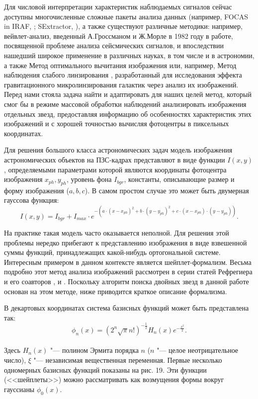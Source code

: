 Для числовой интерпретации характеристик наблюдаемых сигналов сейчас  доступны многочисленные сложные пакеты анализа данных (например,  FOCAS in IRAF, \cite{1981AJ.....86..476J}; SExtractor, \cite{1996A&AS..117..393B}), а также существуют различные методики: например, вейвлет-анализ, введенный А.Гроссманом и Ж.Морле в 1982 году в работе, посвященной проблеме анализа сейсмических сигналов, и впоследствии нашедший широкое применение в различных науках, в том числе и в астрономии, а также Метод оптимального вычитания изображения \cite{1998ApJ...503..325A}  или, например, Метод наблюдения слабого линзирования \cite{1995ApJ...449..460K}, разработанный для исследования эффекта гравитационного микролинзирования галактик через анализ их изображений. Перед нами стояла задача найти и адаптировать для наших целей метод, который смог бы в режиме массовой обработки наблюдений  анализировать изображения отдельных звезд, предоставляя информацию об особенностях характеристик этих изображений и с хорошей точностью вычисляя фотоцентры в пиксельных координатах.

Для решения большого класса астрономических задач модель изображения астрономических объектов на ПЗС-кадрах представляют в виде функции $I(x,y)$, определяемыми параметрами которой являются координаты фотоцентра изображения $x_{ph},y_{ph}$, уровень фона $I_{bgr}$, константы, описывающие размер и форму изображения ($a,b,c$). В самом простом случае это может быть двумерная гауссова функция:
 \begin{equation}
 \label{eq:ShI}
 I(x,y) = I_{bgr}+I_{max}\cdot e^{-(a\cdot(x-x_{ph})^2+b\cdot(y-y_{ph})^2+c\cdot(x-x_{ph})\cdot(y-y_{ph}))}.
 \end{equation}
 
На практике такая модель часто оказывается неполной. Для решения этой проблемы нередко прибегают к представлению изображения в виде взвешенной суммы функций, принадлежащих какой-нибудь ортогональной системе. Интересным примером в данном контексте является шейплет-формализм. Весьма подробно этот метод анализа изображений рассмотрен в серии статей Рефрегиера и его соавторов \cite{2003MNRAS.338...35R}, \cite{2003MNRAS.338...48R} и \cite{2005MNRAS.363..197M}. Поскольку алгоритм поиска двойных звезд в данной работе основан на этом методе, ниже приводится краткое описание формализма.

В декартовых координатах система базисных функций может быть представлена так:\\
\begin{equation}
\label{eq:ShBasis}
\phi_n(x) = \left(2^n\sqrt{\pi}n!\right)^{-\frac{1}{2}}H_n(x)e^{-\frac{x^2}{2}}.
\end{equation}
\\Здесь $H_n(x)$ "--- полином Эрмита порядка $n$ ($n$ "--- целое неотрицательное число), $\xi$ "--- независимая вещественная переменная.
Первые несколько одномерных базисных функций показаны на рис. 19. Эти функции (<<шейплеты>>) можно рассматривать как возмущения формы вокруг гауссианы $\phi_0(x)$.

